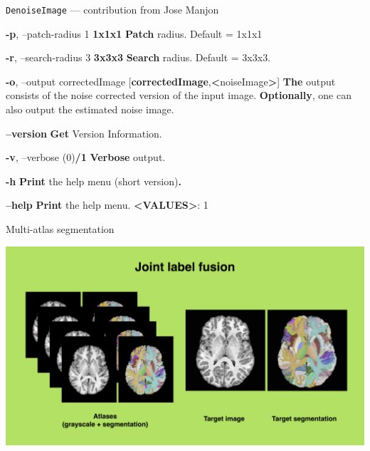 \documentclass[ignorenonframetext,]{beamer}
\newenvironment{Shaded}{\begin{snugshade}}{\end{snugshade}}
\newcommand{\KeywordTok}[1]{\textcolor[rgb]{0.13,0.29,0.53}{\textbf{{#1}}}}
\newcommand{\NormalTok}[1]{{#1}}
\begin{document}
\begin{frame}[fragile]{\texttt{DenoiseImage} --- contribution from Jose
Manjon}
\begin{Shaded}
\begin{Highlighting}[]
     \KeywordTok{-p}\NormalTok{, --patch-radius 1}
                        \KeywordTok{1x1x1}
          \KeywordTok{Patch} \NormalTok{radius. Default = 1x1x1}

     \KeywordTok{-r}\NormalTok{, --search-radius 3}
                         \KeywordTok{3x3x3}
          \KeywordTok{Search} \NormalTok{radius. Default = 3x3x3.}

     \KeywordTok{-o}\NormalTok{, --output correctedImage}
                  \NormalTok{[}\KeywordTok{correctedImage}\NormalTok{,}\KeywordTok{<}\NormalTok{noiseImage}\KeywordTok{>}\NormalTok{]}
          \KeywordTok{The} \NormalTok{output consists of the noise corrected version of the input image.}
          \KeywordTok{Optionally}\NormalTok{, one can also output the estimated noise image.}

     \KeywordTok{--version}
          \KeywordTok{Get} \NormalTok{Version Information.}

     \KeywordTok{-v}\NormalTok{, --verbose (0)}\KeywordTok{/1}
          \KeywordTok{Verbose} \NormalTok{output.}

     \KeywordTok{-h}
          \KeywordTok{Print} \NormalTok{the help menu (short version)}\KeywordTok{.}

     \KeywordTok{--help}
          \KeywordTok{Print} \NormalTok{the help menu.}
          \KeywordTok{<VALUES>}\NormalTok{: 1}
\end{Highlighting}
\end{Shaded}

\end{frame}

\begin{frame}{Multi-atlas segmentation}

\includegraphics{./tools/jointfusion/figures/jointLabelFusion.png}

\end{frame}
\end{document}
